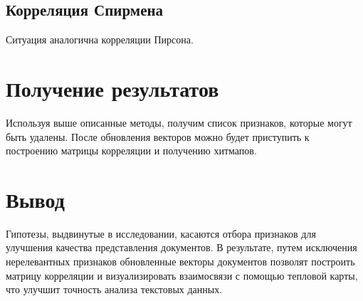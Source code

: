 \subsection{Корреляция Спирмена}
Ситуация аналогична корреляции Пирсона.

\section{Получение результатов}
Используя выше описанные методы, получим список признаков, которые могут быть удалены.
После обновления векторов можно будет приступить к построению матрицы корреляции и получению хитмапов.

\section*{Вывод}
Гипотезы, выдвинутые в исследовании, касаются отбора признаков для улучшения качества представления документов. 
В результате, путем исключения нерелевантных признаков обновленные векторы документов позволят построить матрицу корреляции и 
визуализировать взаимосвязи с помощью тепловой карты, что улучшит точность анализа текстовых данных.

\clearpage
